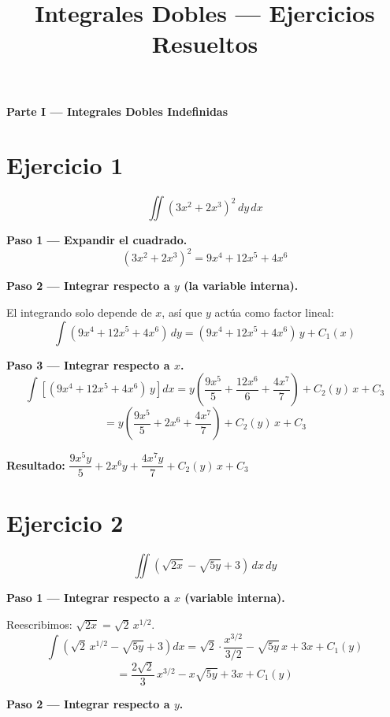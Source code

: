 \documentclass[12pt,a4paper]{article}
\title{\textbf{Integrales Dobles — Ejercicios Resueltos}}
\author{}
\date{}
\newcommand{\resultado}[1]{%
  \textcolor{resultcolor}{\textbf{Resultado: } $\displaystyle #1$}%
}
\begin{document}
\maketitle

\begin{center}
\Large\bfseries Parte I — Integrales Dobles Indefinidas
\end{center}

\section*{Ejercicio 1}
\[
  \iint (3x^2 + 2x^3)^2 \, dy \, dx
\]

\textbf{Paso 1 — Expandir el cuadrado.}
\[
  (3x^2 + 2x^3)^2 = 9x^4 + 12x^5 + 4x^6
\]

\textbf{Paso 2 — Integrar respecto a $y$ (la variable interna).}

El integrando solo depende de $x$, así que $y$ actúa como factor lineal:
\[
  \int (9x^4 + 12x^5 + 4x^6)\,dy = (9x^4 + 12x^5 + 4x^6)\,y + C_1(x)
\]

\textbf{Paso 3 — Integrar respecto a $x$.}
\[
  \int \left[(9x^4 + 12x^5 + 4x^6)\,y\right] dx
  = y \left(\frac{9x^5}{5} + \frac{12x^6}{6} + \frac{4x^7}{7}\right) + C_2(y)\,x + C_3
\]
\[
  = y \left(\frac{9x^5}{5} + 2x^6 + \frac{4x^7}{7}\right) + C_2(y)\,x + C_3
\]

\medskip
\resultado{\dfrac{9x^5 y}{5} + 2x^6 y + \dfrac{4x^7 y}{7} + C_2(y)\,x + C_3}

\bigskip
\section*{Ejercicio 2}
\[
  \iint (\sqrt{2x} - \sqrt{5y} + 3) \, dx \, dy
\]

\textbf{Paso 1 — Integrar respecto a $x$ (variable interna).}

Reescribimos: $\sqrt{2x} = \sqrt{2}\,x^{1/2}$.
\[
  \int \left(\sqrt{2}\,x^{1/2} - \sqrt{5y} + 3\right) dx
  = \sqrt{2}\cdot\frac{x^{3/2}}{3/2} - \sqrt{5y}\,x + 3x + C_1(y)
\]
\[
  = \frac{2\sqrt{2}}{3}\,x^{3/2} - x\sqrt{5y} + 3x + C_1(y)
\]

\textbf{Paso 2 — Integrar respecto a $y$.}
\end{document}
